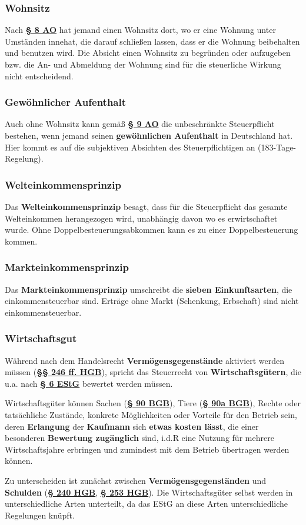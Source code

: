 \documentclass[12pt,A4]{extarticle}
\newcommand{\highlight}[1]{\textcolor{highlightColor}{\textbf{#1}}}
\newcommand{\estG}[2][]{\textbf{\textcolor{gesetzLink}{\href{https://www.gesetze-im-internet.de/estg/__#2.html}{§ #2 \ifthenelse{\equal{#1}{}}{}{#1 }EStG}}}}
\newcommand{\abgabenordnung}[2][]{\textbf{\textcolor{gesetzLink}{\href{https://www.gesetze-im-internet.de/ao_1977/__#2.html}{§ #2 \ifthenelse{\equal{#1}{}}{}{#1 }AO}}}}
\newcommand{\bgb}[2][]{\textbf{\textcolor{gesetzLink}{\href{https://www.gesetze-im-internet.de/bgb/__#2.html}{§ #2 \ifthenelse{\equal{#1}{}}{}{#1 }BGB}}}}
\newcommand{\hgb}[2][]{\textbf{\textcolor{gesetzLink}{\href{https://www.gesetze-im-internet.de/hgb/__#2.html}{§ #2 \ifthenelse{\equal{#1}{}}{}{#1 }HGB}}}}
\newcommand{\hgbb}[2][]{\textbf{\textcolor{gesetzLink}{\href{https://www.gesetze-im-internet.de/hgb/__#2.html}{§§ #1 HGB}}}}
\begin{document}
\subsubsection{Wohnsitz}
Nach \abgabenordnung{8} hat jemand einen Wohnsitz dort, wo er eine Wohnung unter Umständen innehat, die darauf schließen lassen, dass er die Wohnung beibehalten und benutzen wird. Die Absicht einen Wohnsitz zu begründen oder aufzugeben bzw. die An- und Abmeldung der Wohnung sind für die steuerliche Wirkung nicht entscheidend.

\subsubsection{Gewöhnlicher Aufenthalt}
Auch ohne Wohnsitz kann gemäß \abgabenordnung{9} die unbeschränkte Steuerpflicht bestehen, wenn jemand seinen \textbf{gewöhnlichen Aufenthalt} in Deutschland hat. Hier kommt es auf die subjektiven Absichten des Steuerpflichtigen an (183-Tage-Regelung).

\subsubsection{Welteinkommensprinzip}\label{sec:welteinkommensprinzip}
Das \highlight{Welteinkommensprinzip} besagt, dass für die Steuerpflicht das gesamte Welteinkommen herangezogen wird, unabhängig davon wo es erwirtschaftet wurde. Ohne Doppelbesteuerungsabkommen kann es zu einer Doppelbesteuerung kommen.

\subsubsection{Markteinkommensprinzip}
Das \textbf{Markteinkommensprinzip} umschreibt die \textbf{sieben Einkunftsarten}, die einkommensteuerbar sind. Erträge ohne Markt (Schenkung, Erbschaft) sind nicht einkommensteuerbar.

\subsubsection{Wirtschaftsgut}
Während nach dem Handelsrecht \textbf{Vermögensgegenstände} aktiviert werden müssen (\hgbb[246 ff.]{246}), spricht das Steuerrecht von \highlight{Wirtschaftsgütern}, die u.a. nach \estG{6} bewertet werden müssen.\par
Wirtschaftsgüter können Sachen (\bgb{90}), Tiere (\bgb{90a}), Rechte oder tatsächliche Zustände, konkrete Möglichkeiten oder Vorteile für den Betrieb sein, deren \textbf{Erlangung} der \textbf{Kaufmann} sich \textbf{etwas kosten lässt}, die einer besonderen \textbf{Bewertung zugänglich} sind, i.d.R eine Nutzung für mehrere Wirtschaftsjahre erbringen und zumindest mit dem Betrieb übertragen werden können.\par
Zu unterscheiden ist zunächst zwischen \textbf{Vermögensgegenständen} und \textbf{Schulden} (\hgb[Abs. 1]{240}, \hgb{253}). Die Wirtschaftsgüter selbst werden in unterschiedliche Arten unterteilt, da das EStG an diese Arten unterschiedliche Regelungen knüpft.
\end{document}
